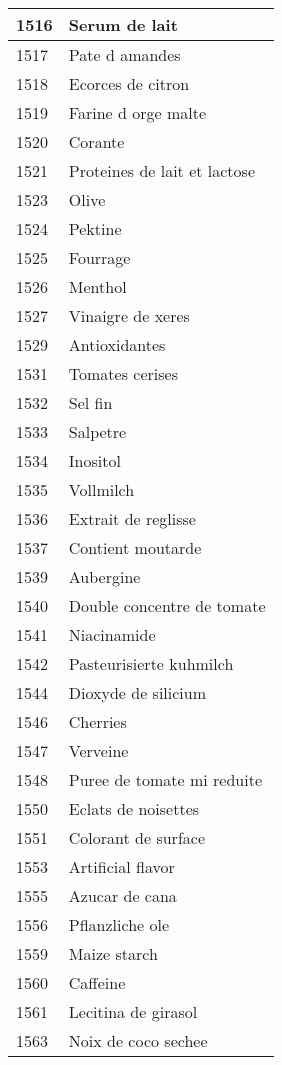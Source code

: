 \begin{longtable}{|l|l|}
1516 & Serum de lait \\ \hline 
1517 & Pate d amandes \\ \hline 
1518 & Ecorces de citron \\ \hline 
1519 & Farine d orge malte \\ \hline 
1520 & Corante \\ \hline 
1521 & Proteines de lait et lactose \\ \hline 
1523 & Olive \\ \hline 
1524 & Pektine \\ \hline 
1525 & Fourrage \\ \hline 
1526 & Menthol \\ \hline 
1527 & Vinaigre de xeres \\ \hline 
1529 & Antioxidantes \\ \hline 
1531 & Tomates cerises \\ \hline 
1532 & Sel fin \\ \hline 
1533 & Salpetre \\ \hline 
1534 & Inositol \\ \hline 
1535 & Vollmilch \\ \hline 
1536 & Extrait de reglisse \\ \hline 
1537 & Contient moutarde \\ \hline 
1539 & Aubergine \\ \hline 
1540 & Double concentre de tomate \\ \hline 
1541 & Niacinamide \\ \hline 
1542 & Pasteurisierte kuhmilch \\ \hline 
1544 & Dioxyde de silicium \\ \hline 
1546 & Cherries \\ \hline 
1547 & Verveine \\ \hline 
1548 & Puree de tomate mi reduite \\ \hline 
1550 & Eclats de noisettes \\ \hline 
1551 & Colorant de surface \\ \hline 
1553 & Artificial flavor \\ \hline 
1555 & Azucar de cana \\ \hline 
1556 & Pflanzliche ole \\ \hline 
1559 & Maize starch \\ \hline 
1560 & Caffeine \\ \hline 
1561 & Lecitina de girasol \\ \hline 
1563 & Noix de coco sechee \\ \hline 

\end{longtable}
